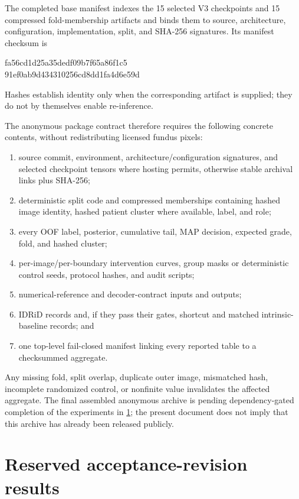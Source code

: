 \documentclass[10pt,twocolumn,letterpaper]{article}
\begin{document}
The completed base manifest indexes the 15 selected V3 checkpoints and 15
compressed fold-membership artifacts and binds them to source, architecture,
configuration, implementation, split, and SHA-256 signatures.  Its manifest
checksum is
\begin{center}
\scriptsize\ttfamily
fa56cd1d25a35dedf09b7f65a86f1c5\\
91ef0ab9d434310256cd8dd1fa4d6e59d
\end{center}
Hashes establish identity only when the corresponding artifact is supplied;
they do not by themselves enable re-inference.

The anonymous package contract therefore requires the following concrete
contents, without redistributing licensed fundus pixels:
\begin{enumerate}[leftmargin=*,itemsep=2pt,topsep=3pt]
  \item source commit, environment, architecture/configuration signatures, and
        selected checkpoint tensors where hosting permits, otherwise stable
        archival links plus SHA-256;
  \item deterministic split code and compressed memberships containing hashed
        image identity, hashed patient cluster where available, label, and role;
  \item every OOF label, posterior, cumulative tail, MAP decision, expected
        grade, fold, and hashed cluster;
  \item per-image/per-boundary intervention curves, group masks or deterministic
        control seeds, protocol hashes, and audit scripts;
  \item numerical-reference and decoder-contract inputs and outputs;
  \item IDRiD records and, if they pass their gates, shortcut and matched
        intrinsic-baseline records; and
  \item one top-level fail-closed manifest linking every reported table to a
        checksummed aggregate.
\end{enumerate}
Any missing fold, split overlap, duplicate outer image, mismatched hash,
incomplete randomized control, or nonfinite value invalidates the affected
aggregate.  The final assembled anonymous archive is pending dependency-gated
completion of the experiments in \cref{sec:pending}; the present document does
not imply that this archive has already been released publicly.

\section{Reserved acceptance-revision results}
\label{sec:pending}
\end{document}
